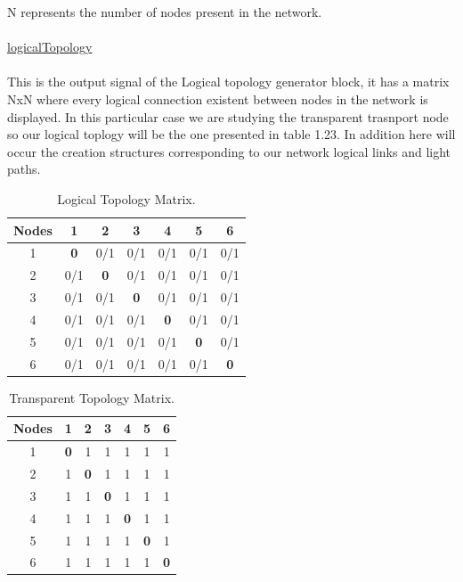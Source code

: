 N represents the number of nodes present in the network.\\ \\
\underline{logicalTopology}\\
\\
This is the output signal of the Logical topology generator block, it has a matrix NxN where every logical connection existent between nodes in the network is displayed. In this particular case we are studying the transparent trasnport node so our logical toplogy will be the one presented in table 1.23. In addition here will occur the creation structures corresponding to our network logical links and light paths.\\

\begin{table}[H]
	\centering	
	\begin{tabular}{|c|c|c|c|c|c|c|}
		\hline
		\multicolumn{1}{|l|}{Nodes} & 1   & 2   & 3   & 4   & 5   & 6   \\ \hline
		1                           & \textbf{0}   & 0/1 & 0/1 & 0/1 & 0/1 & 0/1 \\ \hline
		2                           & 0/1 & \textbf{0}   & 0/1 & 0/1 & 0/1 & 0/1 \\ \hline
		3                           & 0/1 & 0/1 & \textbf{0}   & 0/1 & 0/1 & 0/1 \\ \hline
		4                           & 0/1 & 0/1 & 0/1 & \textbf{0}   & 0/1 & 0/1 \\ \hline
		5                           & 0/1 & 0/1 & 0/1 & 0/1 & \textbf{0}   & 0/1 \\ \hline
		6                           & 0/1 & 0/1 & 0/1 & 0/1 & 0/1 & \textbf{0}   \\ \hline
	\end{tabular}
	\caption{Logical Topology Matrix.}
	\label{logical_topology}
\end{table}
\begin{table}[H]
	\centering	
	\begin{tabular}{|c|c|c|c|c|c|c|}
		\hline
		\multicolumn{1}{|l|}{Nodes} & 1   & 2   & 3   & 4   & 5   & 6  \\ \hline
		1                           & \textbf{0}   & 1 & 1 & 1 & 1 & 1 \\ \hline
		2                           & 1 & \textbf{0}   & 1 & 1 & 1 & 1 \\ \hline
		3                           & 1 & 1 & \textbf{0}   & 1 & 1 & 1 \\ \hline
		4                           & 1 & 1 & 1 & \textbf{0}   & 1 & 1 \\ \hline
		5                           & 1 & 1 & 1 & 1 & \textbf{0}   & 1 \\ \hline
		6                           & 1 & 1 & 1 & 1 & 1 & \textbf{0}   \\ \hline
	\end{tabular}
	\caption{Transparent Topology Matrix.}
	\label{Transparentlogical_topology}
\end{table}

